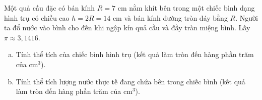 \begin{bt}%
Một quả cầu đặc có bán kính $R = 7\text{ cm}$ nằm khít bên trong một chiếc bình dạng hình trụ có chiều cao $h = 2R = 14\text{ cm}$ và bán kính đường tròn đáy bằng $R$. Người ta đổ nước vào bình cho đến khi ngập kín quả cầu và đầy tràn miệng bình. Lấy $\pi \approx 3{,}1416$.
\begin{enumerate}[a)]
    \item Tính thể tích của chiếc bình hình trụ (kết quả làm tròn đến hàng phần trăm của $\text{cm}^3$).
    \item Tính thể tích lượng nước thực tế đang chứa bên trong chiếc bình (kết quả làm tròn đến hàng phần trăm của $\text{cm}^3$).
\end{enumerate}
\end{bt}


